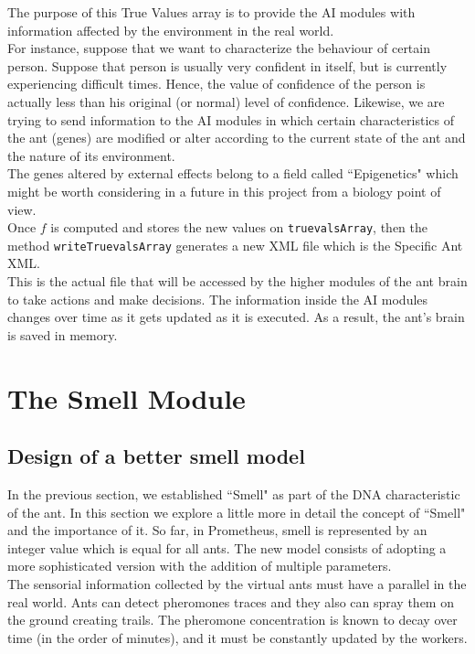 \documentclass[titlepage, 12pt]{article}
\begin{document}
The purpose of this True Values array is to provide the AI modules with information affected by the environment in the real world. \\

For instance, suppose that we want to characterize the behaviour of certain person. Suppose that person is usually very confident in itself, but is currently experiencing difficult times. Hence, the value of confidence of the person is actually less than his original (or normal) level of confidence. Likewise, we are trying to send information to the AI modules in which certain characteristics of the ant (genes) are modified or alter according to the current state of the ant and the nature of its environment. \\

The genes altered by external effects belong to a field called ``Epigenetics" which might be worth considering in a future in this project from a biology point of view. \\

Once $f$ is computed and stores the new values on {\tt truevalsArray}, then the method {\tt writeTruevalsArray} generates a new XML file which is the Specific Ant XML.\\

 This is the actual file that will be accessed by the higher modules of the ant brain to take actions and make decisions. The information inside the AI modules changes over time as it gets updated as it is executed. As a result, the ant's brain is saved in memory. 

\section{The Smell Module}
\subsection{Design of a better smell model}

In the previous section, we established ``Smell" as part of the DNA characteristic of the ant. In this section we explore a little more in detail the concept of ``Smell" and the importance of it. So far, in Prometheus, smell is represented by an integer value which is equal for all ants. The new model consists of adopting a more sophisticated version with the addition of multiple parameters. \\

The sensorial information collected by the virtual ants must have a parallel in the real world. Ants can detect pheromones traces and they also can spray them on the ground creating trails. The pheromone concentration is known to decay over time (in the order of minutes), and it must be constantly updated by the workers. \\
\end{document}
